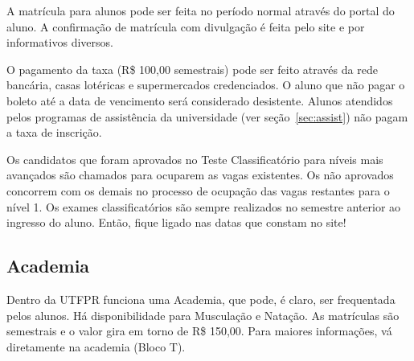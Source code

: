 \documentclass[a4paper,12pt,openany]{article}
\begin{document}
A matrícula para alunos pode ser feita no período normal através do portal do aluno. A confirmação de matrícula com divulgação é feita pelo site e por informativos diversos.

O pagamento da taxa (R\$ 100,00 semestrais) pode ser feito através da rede bancária, casas lotéricas e supermercados credenciados. O aluno que não pagar o boleto até a data de vencimento será considerado desistente. Alunos atendidos pelos programas de assistência da universidade (ver seção~\ref{sec:assist}) não pagam a taxa de inscrição.

Os candidatos que foram aprovados no Teste Classificatório para níveis mais avançados são chamados para ocuparem as vagas existentes. Os não aprovados concorrem com os demais no processo de ocupação das vagas restantes para o nível 1. Os exames classificatórios são sempre realizados no semestre anterior ao ingresso do aluno. Então, fique ligado nas datas que constam no site!



\subsection{Academia}

Dentro da UTFPR funciona uma Academia, que pode, é claro, ser frequentada pelos alunos. Há disponibilidade para Musculação e Natação. As matrículas são semestrais e o valor gira em torno de R\$ 150,00. Para maiores informações, vá diretamente na academia (Bloco T).




\end{document}
